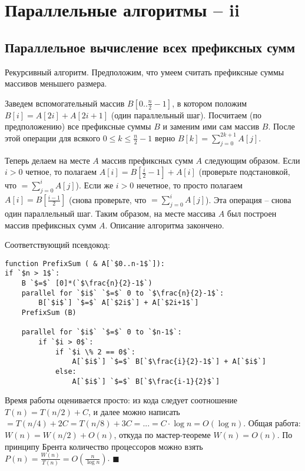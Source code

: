 \section{Параллельные алгоритмы -- ii}
\subsection{Параллельное вычисление всех префиксных сумм}

 Рекурсивный алгоритм. Предположим, что умеем считать префиксные суммы массивов меньшего размера. 

Заведем вспомогательный массив $B[0..\frac{n}{2}-1]$, в котором положим $B[i]=A[2i]+A[2i+1]$ (один параллельный шаг). Посчитаем (по предположению) все префиксные суммы $B$ и заменим ими сам массив $B$. После этой операции для всякого $0 \leq k \leq \frac{n}{2}-1$ верно $B[k] = \sum_{j=0}^{2k+1} A[j]$. 

Теперь делаем на месте $A$ массив префиксных сумм $A$ следующим образом. Если $i > 0$ четное, то полагаем $A[i] = B[\frac{i}{2}-1] + A[i]$ (проверьте подстановкой, что $=\sum_{j=0}^{i}A[j]$). Если же $i > 0$ нечетное, то просто полагаем $A[i] = B[\frac{i-1}{2}]$ (снова проверьте, что $=\sum_{j=0}^{i}A[j]$). Эта операция -- снова один параллельный шаг. Таким образом, на месте массива $A$ был построен массив префиксных сумм $A$. Описание алгоритма закончено.

Соответствующий псевдокод:
\begin{lstlisting}[escapeinside=``]
function PrefixSum ( & A[`$0..n-1$`]):
if `$n > 1$`: 
    B `$=$` [0]*(`$\frac{n}{2}-1$`)
    parallel for `$i$` `$=$` 0 to `$\frac{n}{2}-1$`:
        B[`$i$`] `$=$` A[`$2i$`] + A[`$2i+1$`]
    PrefixSum (B)
    
    parallel for `$i$` `$=$` 0 to `$n-1$`:
        if `$i > 0$`:
            if `$i \% 2 == 0$`:
                A[`$i$`] `$=$` B[`$\frac{i}{2}-1$`] + A[`$i$`]
            else:
                A[`$i$`] `$=$` B[`$\frac{i-1}{2}$`]
\end{lstlisting}

Время работы оценивается просто: из кода следует соотношение $T(n) = T(n/2) + C$, и далее можно написать $= T(n/4) + 2C = T(n/8) + 3C = ... = C\cdot\log n = O(\log n)$. Общая работа: $W(n) = W(n/2) + O(n)$, откуда по мастер-теореме $W(n) = O(n)$. По принципу Брента количество процессоров можно взять $P(n) = \frac{W(n)}{T(n)} = O(\frac{n}{\log n})$. $\blacksquare$

